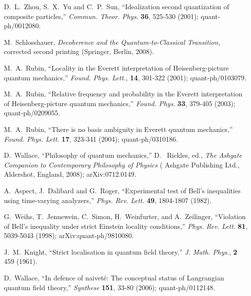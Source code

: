 \documentclass[12pt]{article}
\begin{document}
{\begin{thebibliography}{99}
D.~L.~Zhou, S.~X.~Yu and C.~P.~Sun, ``Idealization second quantization of composite particles,'' 
{\em Commun. Theor. Phys.}\/ {\bf 36}, 525-530 (2001); quant-ph/0012080. 



M.~Schlosshauer, {\em Decoherence and the Quantum-to-Classical Transition,}\/ corrected second
printing (Springer, Berlin, 2008).

 M.~A.~Rubin,  ``Locality in the Everett interpretation of 
Heisenberg-picture quantum mechanics,'' {\em Found. Phys. Lett.,}\/ {\bf 14}, 301-322 (2001);
quant-ph/0103079.

 M.~A.~Rubin, ``Relative frequency and probability in the Everett interpretation of Heisenberg-picture quantum mechanics,'' {\em Found. Phys.}\/ {\bf 33}, 379-405  (2003); quant-ph/0209055.

M.~A.~Rubin, ``There is no basis ambiguity in Everett quantum
mechanics,'' {\em Found. Phys. Lett.}\/ {\bf 17}, 323-341 (2004); quant-ph/0310186.

 D.~Wallace, ``Philosophy of quantum mechanics,'' D.~ Rickles, ed.,  {\em The Ashgate Companion to Contemporary Philosophy of Physics}\/ ( Ashgate Publishing Ltd., Aldershot, England, 2008);  arXiv:0712.0149.



A.~Aspect, J.~Dalibard and G.~Roger, ``Experimental test of Bell's inequalities using time-varying analyzers,''
{\em Phys. Rev. Lett.}\/ {\bf 49}, 1804-1807 (1982).




G.~Weihs, T.~Jennewein, C.~Simon, H.~Weinfurter, and A.~Zeilinger, ``Violation of Bell's inequality under strict Einstein locality conditions,'' {\em Phys. Rev. Lett.}\/ {\bf 81}, 5039-5043 (1998); arXiv:quant-ph/9810080.









J.~M.~Knight, ``Strict localisation in quantum field theory,'' {\em J. Math. Phys.}, {\bf 2} 459 (1961).

D.~Wallace, ``In defence of naivet\'{e}: The conceptual status of Langrangian quantum field theory,''
{\em Synthese} {\bf 151}, 33-80 (2006); quant-ph/0112148.



\end{thebibliography}}
\end{document}
